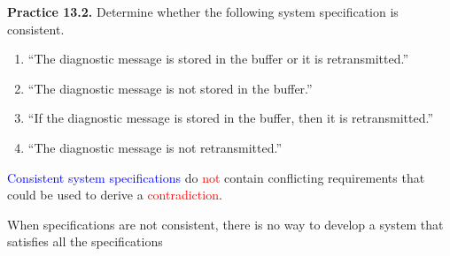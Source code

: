 \documentclass[aspectratio=169]{beamer}
\providecommand{\Blue}[1]{\textcolor{blue}{#1}}
\providecommand{\Red}[1]{\textcolor{red}{#1}}
\begin{document}
\begin{frame}[plain]{}

 {\bf Practice 13.2.} Determine whether the following system specification is consistent.
   \begin{enumerate}
    \item ``The diagnostic message is stored in the buffer or it is retransmitted.''
    \item ``The diagnostic message is not stored in the buffer.''
    \item ``If the diagnostic message is stored in the buffer, then it is retransmitted.''
    \item ``The diagnostic message is not retransmitted.''
   \end{enumerate}

 
 \pause
 
 \vspace{.2in}
 
 \Blue{Consistent system specifications} do \Red{not} contain conflicting
requirements that could be used to derive a \Red{contradiction}.
\smallskip

When specifications are not consistent, there is no way to
develop a system that satisfies all the specifications
\medskip

 \vspace{0.7in}
 
\end{frame}
\end{document}
